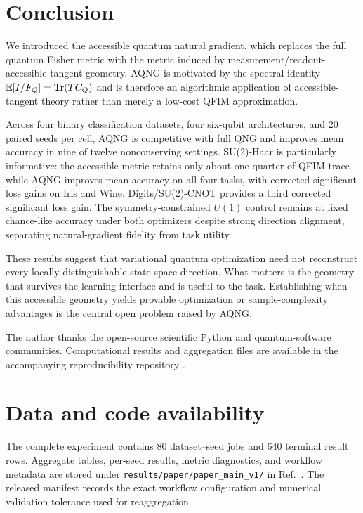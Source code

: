 \section{Conclusion}
We introduced the accessible quantum natural gradient, which replaces the full quantum Fisher metric with the metric induced by measurement/readout-accessible tangent geometry. AQNG is motivated by the spectral identity $\mathbb E[I/F_Q]=\operatorname{Tr}(TC_Q)$ and is therefore an algorithmic application of accessible-tangent theory rather than merely a low-cost QFIM approximation.

Across four binary classification datasets, four six-qubit architectures, and 20 paired seeds per cell, AQNG is competitive with full QNG and improves mean accuracy in nine of twelve nonconserving settings. SU(2)-Haar is particularly informative: the accessible metric retains only about one quarter of QFIM trace while AQNG improves mean accuracy on all four tasks, with corrected significant loss gains on Iris and Wine. Digits/SU(2)-CNOT provides a third corrected significant loss gain. The symmetry-constrained $U(1)$ control remains at fixed chance-like accuracy under both optimizers despite strong direction alignment, separating natural-gradient fidelity from task utility.

These results suggest that variational quantum optimization need not reconstruct every locally distinguishable state-space direction. What matters is the geometry that survives the learning interface and is useful to the task. Establishing when this accessible geometry yields provable optimization or sample-complexity advantages is the central open problem raised by AQNG.

\begin{acknowledgments}
The author thanks the open-source scientific Python and quantum-software communities. Computational results and aggregation files are available in the accompanying reproducibility repository \cite{AQNGRepo}.
\end{acknowledgments}

\section*{Data and code availability}
The complete experiment contains 80 dataset--seed jobs and 640 terminal result rows. Aggregate tables, per-seed results, metric diagnostics, and workflow metadata are stored under \texttt{results/paper/paper\_main\_v1/} in Ref.~\cite{AQNGRepo}. The released manifest records the exact workflow configuration and numerical validation tolerance used for reaggregation.
